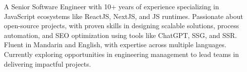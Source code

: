 

\begin{cvparagraph}

  A Senior Software Engineer with 10+ years of experience specializing in JavaScript ecosystems like ReactJS, NextJS, and JS runtimes. Passionate about open-source projects, with proven skills in designing scalable solutions, process automation, and SEO optimization using tools like ChatGPT, SSG, and SSR. Fluent in Mandarin and English, with expertise across multiple languages. Currently exploring opportunities in engineering management to lead teams in delivering impactful projects.
\end{cvparagraph}
